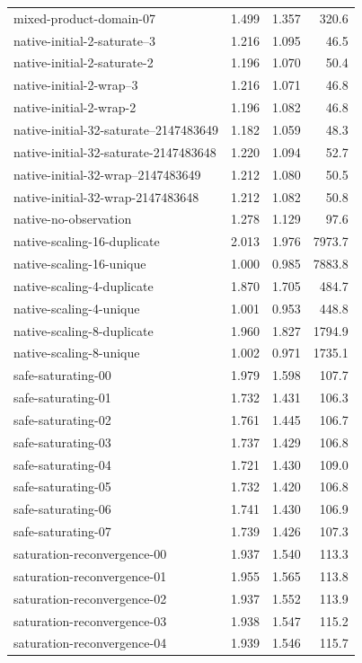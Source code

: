 {\begin{longtable}{lrrr}
mixed-product-domain-07 & 1.499 & 1.357 & 320.6 \\
native-initial-2-saturate--3 & 1.216 & 1.095 & 46.5 \\
native-initial-2-saturate-2 & 1.196 & 1.070 & 50.4 \\
native-initial-2-wrap--3 & 1.216 & 1.071 & 46.8 \\
native-initial-2-wrap-2 & 1.196 & 1.082 & 46.8 \\
native-initial-32-saturate--2147483649 & 1.182 & 1.059 & 48.3 \\
native-initial-32-saturate-2147483648 & 1.220 & 1.094 & 52.7 \\
native-initial-32-wrap--2147483649 & 1.212 & 1.080 & 50.5 \\
native-initial-32-wrap-2147483648 & 1.212 & 1.082 & 50.8 \\
native-no-observation & 1.278 & 1.129 & 97.6 \\
native-scaling-16-duplicate & 2.013 & 1.976 & 7973.7 \\
native-scaling-16-unique & 1.000 & 0.985 & 7883.8 \\
native-scaling-4-duplicate & 1.870 & 1.705 & 484.7 \\
native-scaling-4-unique & 1.001 & 0.953 & 448.8 \\
native-scaling-8-duplicate & 1.960 & 1.827 & 1794.9 \\
native-scaling-8-unique & 1.002 & 0.971 & 1735.1 \\
safe-saturating-00 & 1.979 & 1.598 & 107.7 \\
safe-saturating-01 & 1.732 & 1.431 & 106.3 \\
safe-saturating-02 & 1.761 & 1.445 & 106.7 \\
safe-saturating-03 & 1.737 & 1.429 & 106.8 \\
safe-saturating-04 & 1.721 & 1.430 & 109.0 \\
safe-saturating-05 & 1.732 & 1.420 & 106.8 \\
safe-saturating-06 & 1.741 & 1.430 & 106.9 \\
safe-saturating-07 & 1.739 & 1.426 & 107.3 \\
saturation-reconvergence-00 & 1.937 & 1.540 & 113.3 \\
saturation-reconvergence-01 & 1.955 & 1.565 & 113.8 \\
saturation-reconvergence-02 & 1.937 & 1.552 & 113.9 \\
saturation-reconvergence-03 & 1.938 & 1.547 & 115.2 \\
saturation-reconvergence-04 & 1.939 & 1.546 & 115.7 \\

\end{longtable}}
